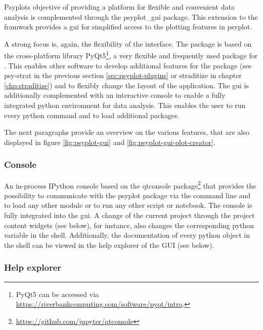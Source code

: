 \begin{refsection}
Psyplots objective of providing a platform for flexible and convenient data analysis is complemented through the psyplot\_gui package. This extension to the framwork provides a \gls{gui} for simplified access to the plotting features in psyplot.

A strong focus is, again, the flexibility of the interface. The package is based on the cross-platform library PyQt5\footnote{PyQt5 can be accessed via \url{https://riverbankcomputing.com/software/pyqt/intro}.}, a very flexible and frequently used package for . This enables other software to develop additional features for the package (see psy-strat in the previous section \ref{sec:psyplot-plugins} or straditize in chapter \ref{chp:straditize}) and to flexibly change the layout of the application. The \gls{gui} is additionally complemented with an interactive console to enable a fully integrated python environment for data analysis. This enables the user to run every python command and to load additional packages. 

The next paragraphs provide an overview on the various features, that are also displayed in figure \ref{fig:psyplot-gui} and \ref{fig:psyplot-gui-plot-creator}.

\subsubsection{Console}
An in-process IPython console based on the qtconsole package\footnote{\url{https://github.com/jupyter/qtconsole}} that provides the possibility to communicate with the psyplot package via the command line and to load any other module or to run any other script or notebook. The console is fully integrated into the \gls{gui}. A change of the current project through the project content widgets (see below), for instance,  also changes the corresponding python variable in the shell. Additionally, the documentation of every python object in the shell can be viewed in the help explorer of the GUI (see below).

\subsubsection{Help explorer}


\end{refsection}
